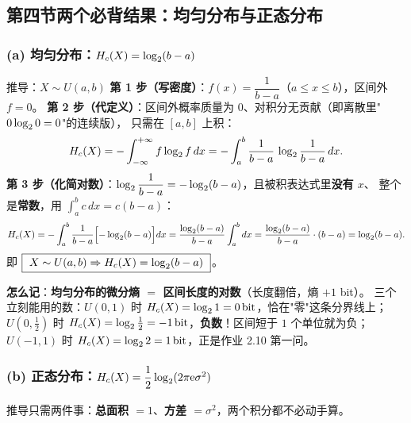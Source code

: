 \subsection{第四节\quad 两个必背结果：均匀分布与正态分布}

\subsubsection{(a) 均匀分布：$H_{c}\!\left(X\right)=\log_{2}(b-a)$}

\begin{calc}{推导：$X\sim U(a,b)$}
\textbf{第 1 步（写密度）}：$f(x)=\dfrac{1}{b-a}$（$a\le x\le b$），区间外 $f=0$。
\textbf{第 2 步（代定义）}：区间外概率质量为 $0$、对积分无贡献（即离散里"$0\log_{2}0=0$"的连续版），
只需在 $[a,b]$ 上积：
\[
H_{c}\!\left(X\right)=-\int_{-\infty}^{+\infty}f\log_{2} f\,dx=-\int_a^b\frac{1}{b-a}\,\log_{2}\frac{1}{b-a}\,dx .
\]
\textbf{第 3 步（化简对数）}：$\log_{2}\dfrac{1}{b-a}=-\log_{2}(b-a)$，且被积表达式里\textbf{没有 $x$}、
整个是\textbf{常数}，用 $\int_a^bc\,dx=c(b-a)$：
\[
H_{c}\!\left(X\right)=-\int_a^b\frac{1}{b-a}\Bigl[-\log_{2}(b-a)\Bigr]dx
=\frac{\log_{2}(b-a)}{b-a}\int_a^b dx=\frac{\log_{2}(b-a)}{b-a}\cdot(b-a)=\log_{2}(b-a).
\]
即 $\boxed{\ X\sim U(a,b)\Rightarrow\Hc{X}=\lb(b-a)\ }$。
\end{calc}

\textbf{怎么记}：\textbf{均匀分布的微分熵 $=$ 区间长度的对数}（长度翻倍，熵 $+1$ bit）。
三个立刻能用的数：$U(0,1)$ 时 $H_{c}\!\left(X\right)=\log_{2}1=0\,\text{bit}$，恰在"零"这条分界线上；
$U(0,\tfrac12)$ 时 $H_{c}\!\left(X\right)=\log_{2}\tfrac12=-1\,\text{bit}$，\textbf{负数}！区间短于 $1$ 个单位就为负；
$U(-1,1)$ 时 $H_{c}\!\left(X\right)=\log_{2}2=1\,\text{bit}$，正是作业 2.10 第一问。

\subsubsection{(b) 正态分布：$H_{c}\!\left(X\right)=\dfrac12\log_{2}(2\pi\mathrm{e}\sigma^2)$}

推导只需两件事：\textbf{总面积 $=1$}、\textbf{方差 $=\sigma^2$}，两个积分都不必动手算。

